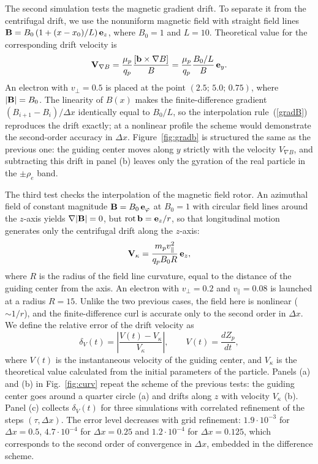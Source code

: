 \documentclass[final,3p]{elsarticle}
\newcommand{\rot}{\mbox{\rm{rot\,}}}
\begin{document}
The second simulation tests the magnetic gradient drift. To separate it from the centrifugal drift, we use the nonuniform magnetic field with straight field lines ${\bf B}=B_0\left(1+(x-x_0)/L\right){\bf e}_z$, where $B_0=1$ and $L=10$. Theoretical value for the corresponding drift velocity is
\begin{equation}\label{vgradb}
	{\bf V}_{\nabla B}=\frac{\mu_p}{q_p}\frac{\left[{\bf b}\times\nabla B\right]}{B}=\frac{\mu_p}{q_p}\frac{B_0/L}{B}\,{\bf e}_y.
\end{equation}
An electron with $v_\perp=0.5$ is placed at the point $(2.5;\,5.0;\,0.75)$, where $|{\bf B}|=B_0$. The linearity of $B(x)$ makes the finite-difference gradient $(B_{i+1}-B_i)/\Delta x$ identically equal to $B_0/L$, so the interpolation rule~(\ref{gradB}) reproduces the drift exactly; at a nonlinear profile the scheme would demonstrate the second-order accuracy in $\Delta x$. Figure~\ref{fig:gradb} is structured the same as the previous one: the guiding center moves along $y$ strictly with the velocity $V_{\nabla B}$, and subtracting this drift in panel (b) leaves only the gyration of the real particle in the $\pm\rho_e$ band.

The third test checks the interpolation of the magnetic field rotor. An azimuthal field of constant magnitude ${\bf B}=B_0\,{\bf e}_\varphi$ at $B_0=1$ with circular field lines around the $z$-axis yields $\nabla|{\bf B}|=0$, but $\rot{\bf b}={\bf e}_z/r$, so that longitudinal motion generates only the centrifugal drift along the $z$-axis:
\begin{equation}\label{vcurv}
	{\bf V}_\kappa=\frac{m_p v_\|^2}{q_p B_0 R}\,{\bf e}_z,
\end{equation}
where $R$ is the radius of the field line curvature, equal to the distance of the guiding center from the axis. An electron with $v_\perp=0.2$ and $v_\|=0.08$ is launched at a radius $R=15$. Unlike the two previous cases, the field here is nonlinear ($\sim1/r$), and the finite-difference curl is accurate only to the second order in $\Delta x$. We define the relative error of the drift velocity as
\begin{equation}\label{errV}
	\delta_V(t)=\left|\frac{V(t)-V_\kappa}{V_\kappa}\right|,\qquad V(t)=\frac{dZ_p}{dt},
\end{equation}
where $V(t)$ is the instantaneous velocity of the guiding center, and $V_\kappa$ is the theoretical value calculated from the initial parameters of the particle. Panels (a) and (b) in Fig.~\ref{fig:curv} repeat the scheme of the previous tests: the guiding center goes around a quarter circle (a) and drifts along $z$ with velocity $V_\kappa$ (b). Panel (c) collects $\delta_V(t)$ for three simulations with correlated refinement of the steps $(\tau,\Delta x)$. The error level decreases with grid refinement: $1.9\cdot10^{-3}$ for $\Delta x=0.5$, $4.7\cdot10^{-4}$ for $\Delta x=0.25$ and $1.2\cdot10^{-4}$ for $\Delta x=0.125$, which corresponds to the second order of convergence in $\Delta x$, embedded in the difference scheme.
\end{document}
